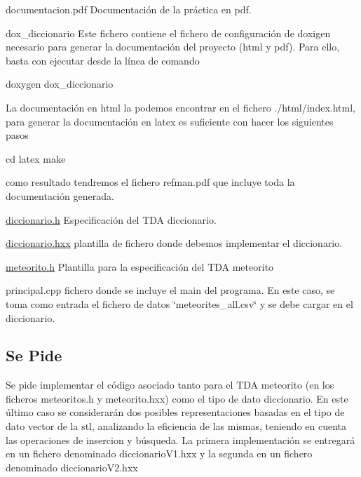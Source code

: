 \begin{DoxyItemize}
\item documentacion.\-pdf \-Documentación de la práctica en pdf. \item dox\-\_\-diccionario \-Este fichero contiene el fichero de configuración de doxigen necesario para generar la documentación del proyecto (html y pdf). \-Para ello, basta con ejecutar desde la línea de comando 
\begin{DoxyCode}
 doxygen dox_diccionario
\end{DoxyCode}
 \-La documentación en html la podemos encontrar en el fichero ./html/index.html, para generar la documentación en latex es suficiente con hacer los siguientes pasos 
\begin{DoxyCode}
 cd latex
 make
\end{DoxyCode}
 como resultado tendremos el fichero refman.\-pdf que incluye toda la documentación generada.\end{DoxyItemize}
\begin{DoxyItemize}
\item \hyperlink{diccionario_8h_source}{diccionario.\-h} \-Especificación del \-T\-D\-A diccionario. \item \hyperlink{diccionario_8hxx_source}{diccionario.\-hxx} plantilla de fichero donde debemos implementar el diccionario. \item \hyperlink{meteorito_8h_source}{meteorito.\-h} \-Plantilla para la especificación del \-T\-D\-A meteorito\end{DoxyItemize}
\begin{DoxyItemize}
\item principal.\-cpp fichero donde se incluye el main del programa. \-En este caso, se toma como entrada el fichero de datos \char`\"{}meteorites\-\_\-all.\-csv\char`\"{} y se debe cargar en el diccionario.\end{DoxyItemize}
\hypertarget{index_ssPide}{}\subsection{\-Se Pide}\label{index_ssPide}
\-Se pide implementar el código asociado tanto para el \-T\-D\-A meteorito (en los ficheros meteoritos.\-h y meteorito.\-hxx) como el tipo de dato diccionario. \-En este último caso se considerarán dos posibles representaciones basadas en el tipo de dato vector de la stl, analizando la eficiencia de las mismas, teniendo en cuenta las operaciones de insercion y búsqueda. \-La primera implementación se entregará en un fichero denominado diccionario\-V1.\-hxx y la segunda en un fichero denominado diccionario\-V2.\-hxx

